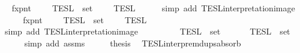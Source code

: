 \begin{isabellebody}
\ \isamarkupfalse%
\ fxpnt{\isasymPhi}{\isacharcolon}\ {\isacartoucheopen}{\isasymInter}\ {\isacharparenleft}{\isacharparenleft}{\isasymlambda}{\isasymphi}{\isachardot}\ {\isasymlbrakk}\ {\isasymphi}\ {\isasymrbrakk}\isactrlsub T\isactrlsub E\isactrlsub S\isactrlsub L{\isacharparenright}\ {\isacharbackquote}\ set\ {\isasymPhi}{\isacharparenright}\ {\isacharequal}\ {\isasymlbrakk}{\isasymlbrakk}\ {\isasymPhi}\ {\isasymrbrakk}{\isasymrbrakk}\isactrlsub T\isactrlsub E\isactrlsub S\isactrlsub L{\isacartoucheclose}\isanewline
\ \ \ \ \isamarkupfalse%
\ {\isacharparenleft}simp\ add{\isacharcolon}\ TESL{\isacharunderscore}interpretation{\isacharunderscore}image{\isacharparenright}\isanewline
\ \ \isamarkupfalse%
\ \isamarkupfalse%
\ fxpnt{\isasymPhi}{\isacharprime}{\isacharcolon}\ {\isacartoucheopen}{\isasymInter}\ {\isacharparenleft}{\isacharparenleft}{\isasymlambda}{\isasymphi}{\isachardot}\ {\isasymlbrakk}\ {\isasymphi}\ {\isasymrbrakk}\isactrlsub T\isactrlsub E\isactrlsub S\isactrlsub L{\isacharparenright}\ {\isacharbackquote}\ set\ {\isasymPhi}{\isacharprime}{\isacharparenright}\ {\isacharequal}\ {\isasymlbrakk}{\isasymlbrakk}\ {\isasymPhi}{\isacharprime}\ {\isasymrbrakk}{\isasymrbrakk}\isactrlsub T\isactrlsub E\isactrlsub S\isactrlsub L{\isacartoucheclose}\isanewline
\ \ \ \ \isamarkupfalse%
\ {\isacharparenleft}simp\ add{\isacharcolon}\ TESL{\isacharunderscore}interpretation{\isacharunderscore}image{\isacharparenright}\isanewline
\ \ \isamarkupfalse%
\ \isamarkupfalse%
\ {\isacartoucheopen}{\isasymInter}\ {\isacharparenleft}{\isacharparenleft}{\isasymlambda}{\isasymphi}{\isachardot}\ {\isasymlbrakk}\ {\isasymphi}\ {\isasymrbrakk}\isactrlsub T\isactrlsub E\isactrlsub S\isactrlsub L{\isacharparenright}\ {\isacharbackquote}\ set\ {\isasymPhi}{\isacharparenright}\ {\isacharequal}\ {\isasymInter}\ {\isacharparenleft}{\isacharparenleft}{\isasymlambda}{\isasymphi}{\isachardot}\ {\isasymlbrakk}\ {\isasymphi}\ {\isasymrbrakk}\isactrlsub T\isactrlsub E\isactrlsub S\isactrlsub L{\isacharparenright}\ {\isacharbackquote}\ set\ {\isasymPhi}{\isacharprime}{\isacharparenright}{\isacartoucheclose}\isanewline
\ \ \ \ \isamarkupfalse%
\ {\isacharparenleft}simp\ add{\isacharcolon}\ assms{\isacharparenright}\isanewline
\ \ \isamarkupfalse%
\ \isamarkupfalse%
\ {\isacharquery}thesis\ \isamarkupfalse%
\ TESL{\isacharunderscore}interp{\isacharunderscore}remdups{\isacharunderscore}absorb\ \isamarkupfalse%

\end{isabellebody}
